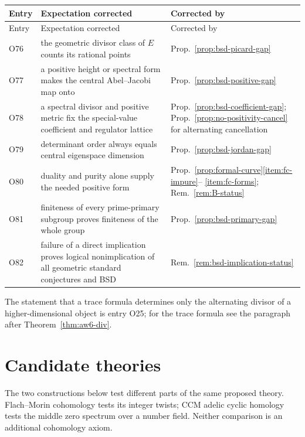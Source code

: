 \documentclass[11pt]{amsart}
\theoremstyle{plain}
\theoremstyle{definition}
\theoremstyle{remark}
\numberwithin{equation}{section}
\begin{document}
\begin{longtable}{@{}l>{\raggedright\arraybackslash}p{}
>{\raggedright\arraybackslash}p{}@{}}
\toprule
Entry & Expectation corrected & Corrected by\\
\midrule
\endfirsthead
\toprule
Entry & Expectation corrected & Corrected by\\
\midrule
\endhead
\bottomrule
\endfoot
O76 & the geometric divisor class of $E$ counts its rational points &
  Prop.~\ref{prop:bsd-picard-gap}\\
O77 & a positive height or spectral form makes the central
  Abel--Jacobi map onto & Prop.~\ref{prop:bsd-positive-gap}\\
O78 & a spectral divisor and positive metric fix the special-value
  coefficient and regulator lattice &
  Prop.~\ref{prop:bsd-coefficient-gap};
  Prop.~\ref{prop:no-positivity-cancel} for alternating cancellation\\
O79 & determinant order always equals central eigenspace dimension &
  Prop.~\ref{prop:bsd-jordan-gap}\\
O80 & duality and purity alone supply the needed positive form &
  Prop.~\ref{prop:formal-curve}\ref{item:fc-impure}--%
  \ref{item:fc-forms}; Rem.~\ref{rem:B-status}\\
O81 & finiteness of every prime-primary subgroup proves finiteness of
  the whole group & Prop.~\ref{prop:bsd-primary-gap}\\
O82 & failure of a direct implication proves logical nonimplication of
  all geometric standard conjectures and BSD &
  Rem.~\ref{rem:bsd-implication-status}\\
\end{longtable}
The statement that a trace formula determines only the alternating
divisor of a higher-dimensional object is entry O25; for the trace
formula see the paragraph after Theorem~\ref{thm:aw6-div}.

\section{Candidate theories}\label{sec:candidates}

The two constructions below test different parts of the same proposed
theory.  Flach--Morin cohomology tests its integer twists; CCM adelic
cyclic homology tests the middle zero spectrum over a number field.
Neither comparison is an additional cohomology axiom.
\end{document}
